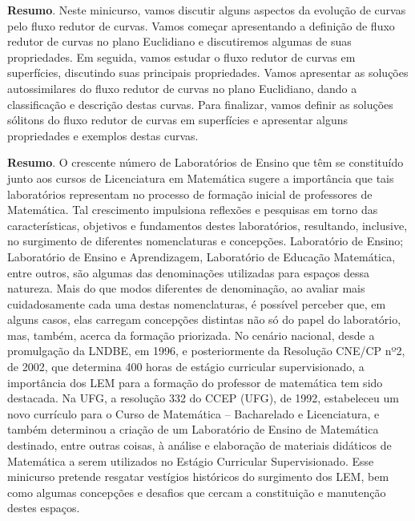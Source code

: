 	
	
	\noindent\textbf{Resumo}.\label{hr} 
	Neste minicurso, vamos discutir alguns aspectos da evolução de curvas pelo fluxo redutor de curvas. Vamos começar apresentando a definição de fluxo redutor de curvas no plano Euclidiano e discutiremos algumas de suas propriedades. Em seguida, vamos estudar o fluxo redutor de curvas em superfícies, discutindo suas principais propriedades. Vamos apresentar as soluções autossimilares do fluxo redutor de curvas no plano Euclidiano, dando a classificação e descrição destas curvas. Para finalizar, vamos definir as soluções sólitons do fluxo redutor de curvas em superfícies e apresentar alguns propriedades e exemplos destas curvas.
	
	\vspace{24pt}
	
	
	
	\noindent\textbf{Resumo}.\label{scd} 
	O crescente número de Laboratórios de Ensino que têm se constituído junto aos cursos de Licenciatura em Matemática sugere a importância que tais laboratórios representam no processo de formação inicial de professores de Matemática. Tal crescimento impulsiona reflexões e pesquisas em torno das características, objetivos e fundamentos destes laboratórios, resultando, inclusive, no surgimento de diferentes nomenclaturas e concepções. Laboratório de Ensino; Laboratório de Ensino e Aprendizagem, Laboratório de Educação Matemática, entre outros, são algumas das denominações utilizadas para espaços dessa natureza. Mais do que modos diferentes de denominação, ao avaliar mais cuidadosamente cada uma destas nomenclaturas, é possível perceber que, em alguns casos, elas carregam concepções distintas não só do papel do laboratório, mas, também, acerca da formação priorizada. No cenário nacional, desde a promulgação da LNDBE, em 1996, e posteriormente da Resolução CNE/CP nº2, de 2002, que determina 400 horas de estágio curricular supervisionado, a importância dos LEM para a formação do professor de matemática tem sido destacada. Na UFG, a resolução 332 do CCEP (UFG), de 1992, estabeleceu um novo currículo para o Curso de Matemática – Bacharelado e Licenciatura, e também determinou a criação de um Laboratório de Ensino de Matemática destinado, entre outras coisas, à análise e elaboração de materiais didáticos de Matemática a serem utilizados no Estágio Curricular Supervisionado. Esse minicurso pretende resgatar vestígios históricos do surgimento dos LEM, bem como algumas concepções e desafios que cercam a constituição e manutenção destes espaços. 
	
